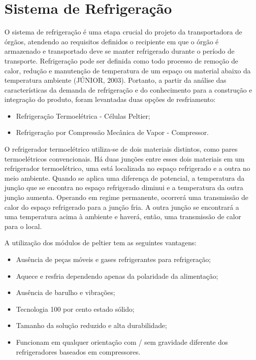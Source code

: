 \section{Sistema de Refrigeração}
O sistema de refrigeração é uma etapa crucial do projeto da transportadora de órgãos, atendendo ao requisitos definidos o recipiente em que o órgão é armazenado e transportado deve se manter refrigerado durante o período de transporte. Refrigeração pode ser definida como todo processo de remoção de calor, redução e manutenção de temperatura de um espaço ou material abaixo da temperatura ambiente (JÚNIOR, 2003). Portanto, a partir da análise das características da demanda de refrigeração e do conhecimento para a construção e integração do produto, foram levantadas duas opções de resfriamento:
	\begin{itemize}
		\item Refrigeração Termoelétrica - Células Peltier;
		\item Refrigeração por Compressão Mecânica de Vapor - Compressor.
	\end{itemize}
	
	O refrigerador termoelétrico utiliza-se de dois materiais distintos, como pares termoelétricos convencionais. Há duas junções entre esses dois materiais em um refrigerador termoelétrico, uma está localizada no espaço refrigerado e a outra no meio ambiente. Quando se aplica uma diferença de potencial, a temperatura da junção que se encontra no espaço refrigerado diminui e a temperatura da outra junção aumenta. Operando em regime permanente, ocorrerá uma transmissão de calor do espaço refrigerado para a junção fria. A outra junção se encontrará a uma temperatura acima à ambiente e haverá, então, uma transmissão de calor para o local.
	
	A utilização dos módulos de peltier tem as seguintes vantagens: 
	
	\begin{itemize}
		\item Ausência de peças móveis e  gases refrigerantes  para refrigeração; 
		\item Aquece e resfria dependendo apenas da polaridade da alimentação;
		\item Ausência de barulho e vibrações;
		\item Tecnologia 100 por cento estado sólido; 
		\item Tamanho da solução reduzido e alta durabilidade;
		\item Funcionam em qualquer orientação com / sem gravidade diferente dos refrigeradores baseados em compressores.
		
	\end{itemize}
	
